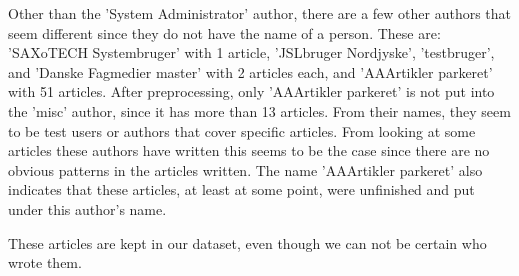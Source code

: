 Other than the 'System Administrator' author, there are a few other authors that seem different since they do not have the name of a person.
These are: 'SAXoTECH Systembruger' with 1 article, 'JSLbruger Nordjyske', 'testbruger', and 'Danske Fagmedier master' with 2 articles each, and 'AAArtikler parkeret' with 51 articles.
After preprocessing, only 'AAArtikler parkeret' is not put into the 'misc' author, since it has more than 13 articles.
From their names, they seem to be test users or authors that cover specific articles.
From looking at some articles these authors have written this seems to be the case since there are no obvious patterns in the articles written.
The name 'AAArtikler parkeret' also indicates that these articles, at least at some point, were unfinished and put under this author's name.

These articles are kept in our dataset, even though we can not be certain who wrote them.

